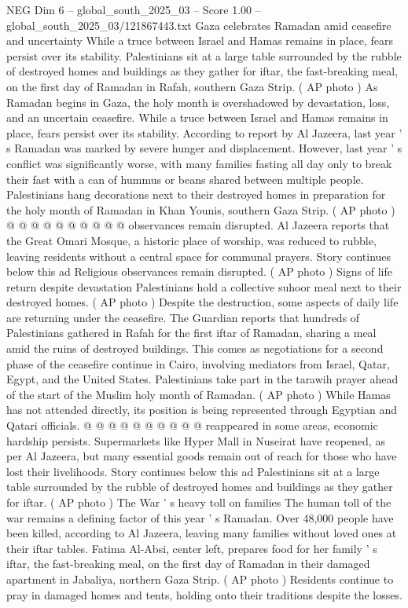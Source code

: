 \begin{textsample}{NEG Dim 6 – global\_south\_2025\_03 – Score 1.00 – global\_south\_2025\_03/121867443.txt}  \label{ex:f6_neg_220}
Gaza celebrates Ramadan amid ceasefire and uncertainty While a truce between Israel and Hamas remains in place, fears persist over its stability.
Palestinians sit at a large table surrounded by the rubble of destroyed homes and buildings as they gather for iftar, the fast-breaking meal, on the first day of Ramadan in Rafah, southern Gaza Strip. ( AP photo ) As Ramadan begins in Gaza, the holy month is overshadowed by devastation, loss, and an uncertain ceasefire.
While a truce between Israel and Hamas remains in place, fears persist over its stability.
According to report by Al Jazeera, last year ' s Ramadan was marked by severe hunger and displacement.
However, last year ' s conflict was significantly worse, with many families fasting all day only to break their fast with a can of hummus or beans shared between multiple people.
Palestinians hang decorations next to their destroyed homes in preparation for the holy month of Ramadan in Khan Younis, southern Gaza Strip. ( AP photo ) @ @ @ @ @ @ @ @ @ @ observances remain disrupted.
Al Jazeera reports that the Great Omari Mosque, a historic place of worship, was reduced to rubble, leaving residents without a central space for communal prayers.
Story continues below this ad Religious observances remain disrupted. ( AP photo ) Signs of life return despite devastation Palestinians hold a collective suhoor meal next to their destroyed homes. ( AP photo ) Despite the destruction, some aspects of daily life are returning under the ceasefire.
The Guardian reports that hundreds of Palestinians gathered in Rafah for the first iftar of Ramadan, sharing a meal amid the ruins of destroyed buildings.
This comes as negotiations for a second phase of the ceasefire continue in Cairo, involving mediators from Israel, Qatar, Egypt, and the United States.
Palestinians take part in the tarawih prayer ahead of the start of the Muslim holy month of Ramadan. ( AP photo ) While Hamas has not attended directly, its position is being represented through Egyptian and Qatari officials. @ @ @ @ @ @ @ @ @ @ reappeared in some areas, economic hardship persists.
Supermarkets like Hyper Mall in Nuseirat have reopened, as per Al Jazeera, but many essential goods remain out of reach for those who have lost their livelihoods.
Story continues below this ad Palestinians sit at a large table surrounded by the rubble of destroyed homes and buildings as they gather for iftar. ( AP photo ) The War ' s heavy toll on families The human toll of the war remains a defining factor of this year ' s Ramadan.
Over 48,000 people have been killed, according to Al Jazeera, leaving many families without loved ones at their iftar tables.
Fatima Al-Absi, center left, prepares food for her family ' s iftar, the fast-breaking meal, on the first day of Ramadan in their damaged apartment in Jabaliya, northern Gaza Strip. ( AP photo ) Residents continue to pray in damaged homes and tents, holding onto their traditions despite the losses.

\end{textsample}
